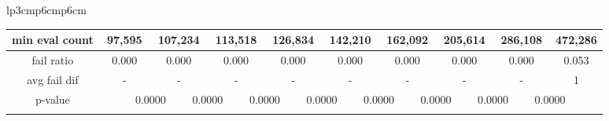 {\begin{tabular}{lp{3cm}p{6cm}p{6cm}}
\begin{tabular}[h]{m{2.5cm}m{}m{}m{}m{}m{}m{}m{}m{}m{}m{}m{}m{}m{}m{}m{}m{}m{}m{}}
\multicolumn{1}{c}{min eval count}&\multicolumn{2}{c}{     97,595}&\multicolumn{2}{c}{  107,234}&\multicolumn{2}{c}{  113,518}&\multicolumn{2}{c}{  126,834}&\multicolumn{2}{c}{  142,210}&\multicolumn{2}{c}{  162,092}&\multicolumn{2}{c}{  205,614}&\multicolumn{2}{c}{  286,108}&\multicolumn{2}{c}{  472,286}\\
\hline
\multicolumn{1}{c}{fail ratio}&\multicolumn{2}{c}{          0.000}&\multicolumn{2}{c}{    0.000}&\multicolumn{2}{c}{    0.000}&\multicolumn{2}{c}{    0.000}&\multicolumn{2}{c}{    0.000}&\multicolumn{2}{c}{    0.000}&\multicolumn{2}{c}{    0.000}&\multicolumn{2}{c}{    0.000}&\multicolumn{2}{c}{    0.053}\\
\multicolumn{1}{c}{avg fail dif}&\multicolumn{2}{c}{            -}&\multicolumn{2}{c}{        -}&\multicolumn{2}{c}{        -}&\multicolumn{2}{c}{        -}&\multicolumn{2}{c}{        -}&\multicolumn{2}{c}{        -}&\multicolumn{2}{c}{        -}&\multicolumn{2}{c}{        -}&\multicolumn{2}{c}{        1}\\
\hline
\multicolumn{1}{c}{p-value}&&\multicolumn{2}{c}{0.0000}&\multicolumn{2}{c}{0.0000}&\multicolumn{2}{c}{0.0000}&\multicolumn{2}{c}{0.0000}&\multicolumn{2}{c}{0.0000}&\multicolumn{2}{c}{0.0000}&\multicolumn{2}{c}{0.0000}&\multicolumn{2}{c}{0.0000}\\
&&&&&&&&&&&&&&&&&&\end{tabular}
\end{tabular}
}
